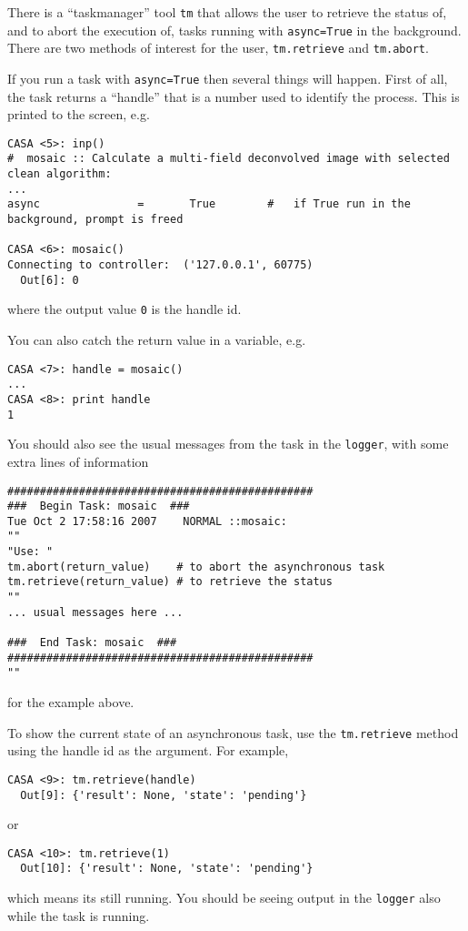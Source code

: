 There is a ``taskmanager'' tool {\tt tm} that allows the user
to retrieve the status of, and to abort the execution of, tasks
running with {\tt async=True} in the background.  There
are two methods of interest for the user, {\tt tm.retrieve} and
{\tt tm.abort}.

If you run a task with {\tt async=True} then several things will
happen.  First of all, the task returns a ``handle'' that is 
a number used to identify the process.  This is printed to the 
screen, e.g. 
\small
\begin{verbatim}
CASA <5>: inp()
#  mosaic :: Calculate a multi-field deconvolved image with selected clean algorithm:
...
async               =       True        #   if True run in the background, prompt is freed

CASA <6>: mosaic()
Connecting to controller:  ('127.0.0.1', 60775)
  Out[6]: 0
\end{verbatim}
\normalsize
where the output value {\tt 0} is the handle id.  

You can also catch the return value in a variable, e.g.
\small
\begin{verbatim}
CASA <7>: handle = mosaic()
...
CASA <8>: print handle
1
\end{verbatim}
\normalsize
You should also see the usual messages from the task in the 
{\tt logger}, with some extra lines of information
\small
\begin{verbatim}
###############################################
###  Begin Task: mosaic  ###
Tue Oct 2 17:58:16 2007    NORMAL ::mosaic:
""
"Use: "
tm.abort(return_value)    # to abort the asynchronous task
tm.retrieve(return_value) # to retrieve the status
""
... usual messages here ...

###  End Task: mosaic  ###
###############################################
""
\end{verbatim}
\normalsize
for the example above.

To show the current state of an asynchronous task, use the
{\tt tm.retrieve} method using the handle id as the argument.
For example,
\small
\begin{verbatim}
CASA <9>: tm.retrieve(handle)
  Out[9]: {'result': None, 'state': 'pending'}
\end{verbatim}
\normalsize
or
\small
\begin{verbatim}
CASA <10>: tm.retrieve(1)
  Out[10]: {'result': None, 'state': 'pending'}
\end{verbatim}
\normalsize
which means its still running.  You should be seeing output in
the {\tt logger} also while the task is running.  

